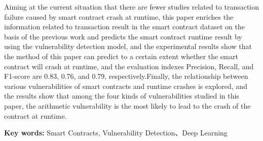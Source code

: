     Aiming at the current situation that there are fewer studies related to transaction failure caused by smart contract crash at runtime, this paper enriches the information related to transaction result in the smart contract dataset on the basis of the previous work and predicts the smart contract runtime result by using the vulnerability detection model, and the experimental results show that the method of this paper can predict to a certain extent whether the smart contract will crash at runtime, and the evaluation indexes Precision, Recall, and F1-score are 0.83, 0.76, and 0.79, respectively.Finally, the relationship between various vulnerabilities of smart contracts and runtime crashes is explored, and the results show that among the four kinds of vulnerabilities studied in this paper, the arithmetic vulnerability is the most likely to lead to the crash of the contract at runtime.



    {\noindent \textbf{Key words: } Smart Contracts, Vulnerability Detection、Deep Learning}
